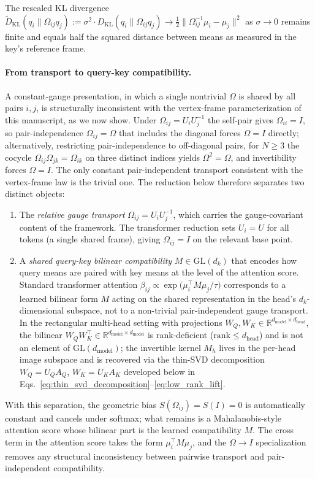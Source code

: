 \documentclass[11pt]{article}
\begin{document}
The rescaled KL divergence $\widetilde{D}_{\mathrm{KL}}(q_i \| \Omega_{ij}q_j) := \sigma^2 \cdot D_{\mathrm{KL}}(q_i \| \Omega_{ij}q_j) \to \frac{1}{2}\|\Omega_{ij}^{-1}\mu_i - \mu_j\|^2$ as $\sigma \to 0$ remains finite and equals half the squared distance between means as measured in the key's reference frame.

\paragraph{From transport to query-key compatibility.}

A constant-gauge presentation, in which a single nontrivial $\Omega$ is shared by all pairs $i,j$, is structurally inconsistent with the vertex-frame parameterization of this manuscript, as we now show. Under $\Omega_{ij} = U_iU_j^{-1}$ the self-pair gives $\Omega_{ii} = I$, so pair-independence $\Omega_{ij} = \Omega$ that includes the diagonal forces $\Omega = I$ directly; alternatively, restricting pair-independence to off-diagonal pairs, for $N \geq 3$ the cocycle $\Omega_{ij}\Omega_{jk} = \Omega_{ik}$ on three distinct indices yields $\Omega^2 = \Omega$, and invertibility forces $\Omega = I$. The only constant pair-independent transport consistent with the vertex-frame law is the trivial one. The reduction below therefore separates two distinct objects:
\begin{enumerate}
\item The \emph{relative gauge transport} $\Omega_{ij} = U_iU_j^{-1}$, which carries the gauge-covariant content of the framework. The transformer reduction sets $U_i = U$ for all tokens (a single shared frame), giving $\Omega_{ij} = I$ on the relevant base point.
\item A \emph{shared query-key bilinear compatibility} $M \in \mathrm{GL}(d_k)$ that encodes how query means are paired with key means at the level of the attention score. Standard transformer attention $\beta_{ij} \propto \exp\big(\mu_i^\top M \mu_j / \tau\big)$ corresponds to a learned bilinear form $M$ acting on the shared representation in the head's $d_k$-dimensional subspace, not to a non-trivial pair-independent gauge transport. In the rectangular multi-head setting with projections $W_Q, W_K \in \mathbb{R}^{d_{\text{model}} \times d_{\text{head}}}$, the bilinear $W_Q W_K^\top \in \mathbb{R}^{d_{\text{model}}\times d_{\text{model}}}$ is rank-deficient ($\mathrm{rank} \le d_{\text{head}}$) and is not an element of $\mathrm{GL}(d_{\text{model}})$; the invertible kernel $M_h$ lives in the per-head image subspace and is recovered via the thin-SVD decomposition $W_Q = U_Q A_Q$, $W_K = U_K A_K$ developed below in Eqs.~\eqref{eq:thin_svd_decomposition}--\eqref{eq:low_rank_lift}.
\end{enumerate}
With this separation, the geometric bias $S(\Omega_{ij}) = S(I) = 0$ is automatically constant and cancels under softmax; what remains is a Mahalanobis-style attention score whose bilinear part is the learned compatibility $M$. The cross term in the attention score takes the form $\mu_i^\top M \mu_j$, and the $\Omega \to I$ specialization removes any structural inconsistency between pairwise transport and pair-independent compatibility.
\end{document}
